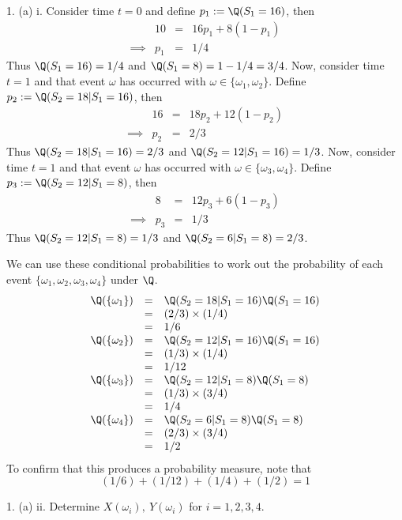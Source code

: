 \documentclass[11pt,a4paper]{article}
\begin{document}
\begin{answer}{1. (a) i.}
  Consider time $t=0$ and define $p_1:=\Q(S_1=16)$, then
  \[\begin{array}{rrcl}
    &10&=&16p_1+8(1-p_1)\\
    \implies&p_1&=&1/4
  \end{array}\]
  Thus $\Q(S_1=16)=1/4$ and $\Q(S_1=8)=1-1/4=3/4$.
  Now, consider time $t=1$ and that event $\omega$ has occurred with $\omega\in\{\omega_1,\omega_2\}$. Define $p_2:=\Q(S_2=18|S_1=16)$, then
  \[\begin{array}{rrcl}
    &16&=&18p_2+12(1-p_2)\\
    \implies&p_2&=&2/3
  \end{array}\]
  Thus $\Q(S_2=18|S_1=16)=2/3$ and $\Q(S_2=12|S_1=16)=1/3$.
  Now, consider time $t=1$ and that event $\omega$ has occurred with $\omega\in\{\omega_3,\omega_4\}$. Define $p_3:=\Q(S_2=12|S_1=8)$, then
  \[\begin{array}{rrcl}
    &8&=&12p_3+6(1-p_3)\\
    \implies&p_3&=&1/3
  \end{array}\]
  Thus $\Q(S_2=12|S_1=8)=1/3$ and $\Q(S_2=6|S_1=8)=2/3$.
  \par We can use these conditional probabilities to work out the probability of each event $\{\omega_1,\omega_2,\omega_3,\omega_4\}$ under $\Q$.
  \[\begin{array}{rcl}
    \Q(\{\omega_1\})&=&\Q(S_2=18|S_1=16)\Q(S_1=16)\\
    &=&(2/3)\times(1/4)\\
    &=&1/6\\
    \Q(\{\omega_2\})&=&\Q(S_2=12|S_1=16)\Q(S_1=16)\\
    &=&(1/3)\times(1/4)\\
    &=&1/12\\
    \Q(\{\omega_3\})&=&\Q(S_2=12|S_1=8)\Q(S_1=8)\\
    &=&(1/3)\times(3/4)\\
    &=&1/4\\
    \Q(\{\omega_4\})&=&\Q(S_2=6|S_1=8)\Q(S_1=8)\\
    &=&(2/3)\times(3/4)\\
    &=&1/2
  \end{array}\]
  To confirm that this produces a probability measure, note that
  \[ (1/6)+(1/12)+(1/4)+(1/2)=1 \]
\end{answer}

\begin{question}{1. (a) ii.}
  Determine $X(\omega_i),\ Y(\omega_i)$ for $i=1,2,3,4$.
\end{question}
\end{document}
